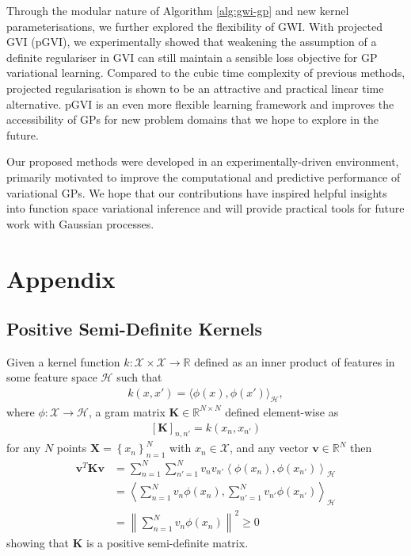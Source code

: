 \documentclass{article}
\numberwithin{equation}{section}
\begin{document}
Through the modular nature of Algorithm \ref{alg:gwi-gp} and new kernel parameterisations, we further explored the flexibility of GWI.
With projected GVI (pGVI), we experimentally showed that weakening the assumption of a definite regulariser in GVI can still maintain a sensible loss objective for GP variational learning.
Compared to the cubic time complexity  of previous methods, projected regularisation is shown to be an attractive and practical linear time alternative. 
pGVI is an even more flexible learning framework and improves the accessibility of GPs for new problem domains that we hope to explore in the future.

Our proposed methods were developed in an experimentally-driven environment, primarily motivated to improve the computational and predictive performance of variational GPs. 
We hope that our contributions have inspired helpful insights into function space variational inference and will provide practical tools for future work with Gaussian processes.


\newpage



\newpage
\appendix
{}
\section{Appendix}

\subsection{Positive Semi-Definite Kernels} \label{appendix:positive-definite-kernel}
Given a kernel function $k: \mathcal{X} \times \mathcal{X} \rightarrow \mathbb{R}$ defined as an inner product of features in some feature space $\mathcal{H}$ such that
\begin{align}
    k(x, x') = \langle \phi(x), \phi(x') \rangle_{\mathcal{H}},
\end{align}
where $\phi: \mathcal{X} \rightarrow \mathcal{H}$, a gram matrix $\mathbf{K} \in \mathbb{R}^{N\times N}$ defined element-wise as
\begin{align}
    \left[\mathbf{K}\right]_{n, n'} = k(x_n, x_{n'})
\end{align}
for any $N$ points $\mathbf{X} = \left\{x_n\right\}_{n=1}^N$ with $x_n \in \mathcal{X}$, and any vector $\mathbf{v} \in \mathbb{R}^N$ then
\begin{align}
    \mathbf{v}^T \mathbf{K} \mathbf{v} &= \sum_{n=1}^N\sum_{n'=1}^N v_n v_{n'}  \left\langle \phi(x_n), \phi(x_{n'}) \right\rangle_{\mathcal{H}} \\
    &= \left\langle\sum_{n=1}^N v_n \phi(x_n), \sum_{n'=1}^N  v_{n'}\phi(x_{n'}) \right\rangle_{\mathcal{H}} \\
    &= \left\| \sum_{n=1}^N v_n \phi(x_n) \right\|^2 \geq 0
\end{align}
showing that $\mathbf{K}$ is a positive semi-definite matrix.
\end{document}
